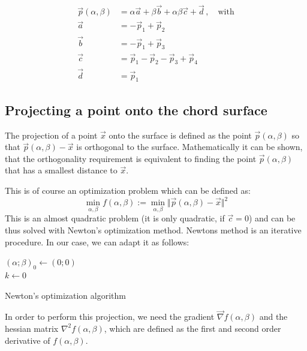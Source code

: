 \begin{align}
\vec p (\alpha, \beta) &= \alpha   \vec a + \beta \vec b + \alpha \beta \vec c + \vec d \, , \quad
\textrm{with}\\
\vec a &= -\vec p_1 + \vec p_2 \nonumber \\
\vec b &= -\vec p_1 + \vec p_3 \nonumber \\
\vec c &= \vec p_1 - \vec p_2 - \vec p_3 + \vec p_4 \nonumber \\
\vec d &= \vec p_1 \nonumber
\end{align}

\subsection{Projecting a point onto the chord surface}
The projection of a point $\vec x$ onto the surface is defined as the point $\vec p(\alpha, \beta)$ so that $\vec p (\alpha, \beta) - \vec x$ is orthogonal to the surface. Mathematically it can be shown, that the orthogonality requirement is equivalent to finding the point $\vec p(\alpha, \beta)$ that has a smallest distance to $\vec x$. \par
This is of course an optimization problem which can be defined as:
\begin{equation}
\min_{\alpha, \beta} f(\alpha, \beta) := \min_{\alpha, \beta} \Vert \vec p(\alpha, \beta) - \vec x \Vert^2
\end{equation}
This is an almost quadratic problem (it is only quadratic, if $\vec c = 0$) and can be thus solved with Newton's optimization method. Newtons method is an iterative procedure. In our case, we can adapt it as follows:

\begin{algorithm}[htb]
 $(\alpha; \beta)_0 \leftarrow (0; 0)$ \\
 $k \leftarrow 0$\\
 \caption{Newton's optimization algorithm}
\end{algorithm}

 
In order to perform this projection, we need the gradient $\vec \nabla f(\alpha, \beta)$ and the hessian matrix $\nabla^2 f(\alpha, \beta)$, which are defined as the first and second order derivative of $f(\alpha, \beta)$. \\

